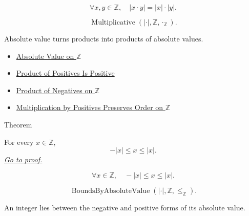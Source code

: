 \begin{remark*}
\[
\forall x,y\in\mathbb{Z},\quad |x\cdot y|=|x|\cdot |y|.
\]
\end{remark*}

\begin{remark*}
\[
\operatorname{Multiplicative}(|\cdot|,\mathbb{Z},\cdot_{\mathbb{Z}}).
\]
\end{remark*}

\begin{remark*}[Interpretation]
Absolute value turns products into products of absolute values.
\end{remark*}

\begin{dependencies}
\begin{itemize}
  \item \hyperref[def:absolute-value-on-z]{Absolute Value on $\mathbb{Z}$}
  \item \hyperref[prop:product-of-positives-is-positive]{Product of Positives Is Positive}
  \item \hyperref[cor:product-of-negatives-on-z]{Product of Negatives on $\mathbb{Z}$}
  \item \hyperref[thm:positive-multiplication-preserves-order-on-z]{Multiplication by Positives Preserves Order on $\mathbb{Z}$}
\end{itemize}
\end{dependencies}

\begin{theorembox}{Theorem}
\begin{theorem}
\label{thm:absolute-value-bounds-on-z}
For every $x\in\mathbb{Z}$,
\[
-|x|\le x\le |x|.
\]
\hyperref[prf:absolute-value-bounds-on-z]{\textit{Go to proof.}}
\end{theorem}
\end{theorembox}

\begin{remark*}
\[
\forall x\in\mathbb{Z},\quad -|x|\le x\le |x|.
\]
\end{remark*}

\begin{remark*}
\[
\operatorname{BoundsByAbsoluteValue}(|\cdot|,\mathbb{Z},\le_{\mathbb{Z}}).
\]
\end{remark*}

\begin{remark*}[Interpretation]
An integer lies between the negative and positive forms of its absolute value.
\end{remark*}

